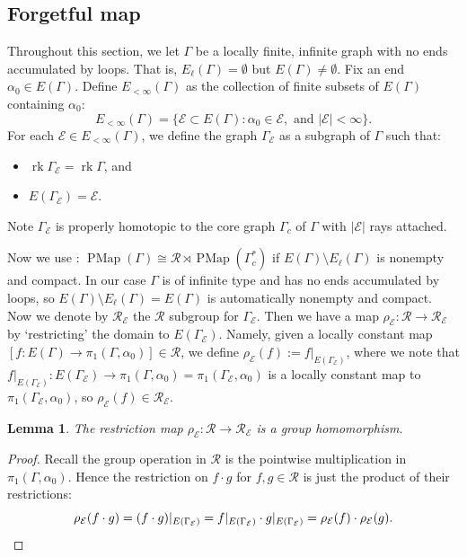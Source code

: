 \documentclass[11pt]{amsart}
\theoremstyle{plain}
\newtheorem{LEM}[THM]{Lemma}
\theoremstyle{definition}
\DeclareMathOperator{\PMap}{PMap}
\DeclareMathOperator{\rk}{rk}
\newcommand{\cE}{\mathcal{E}}
\newcommand{\cR}{\mathcal{R}}
\def\G{{\Gamma}}
\newcommand{\<}{\langle}
\renewcommand{\>}{\rangle}
\begin{document}
\subsection{Forgetful map}
\label{ssec:forgetful}
Throughout this section, we let $\G$ be a locally finite, infinite graph with no ends accumulated by loops. That is, $E_\ell(\G)=\emptyset$ but $E(\G) 
\neq \emptyset$. Fix an end $\alpha_0 \in E(\G)$.
Define $E_{<\infty}(\G)$ as the collection of finite subsets of $E(\G)$ containing $\alpha_0$:
\[
    E_{<\infty}(\G) = \{ \cE \subset E(\G): \alpha_0 \in \cE, \text{ and } |\cE|<\infty\}.
\]
For each $\cE \in E_{<\infty}(\G)$, we define the graph $\G_{\cE}$ as a subgraph of $\G$ such that:
\begin{itemize}
    \item $\rk \G_{\cE} = \rk \G$, and
    \item $E(\G_{\cE}) = \cE$.
\end{itemize}
Note $\G_\cE$ is properly homotopic to the core graph $\G_c$ of $\G$ with $|\cE|$ rays attached.

Now we use : $\PMap(\G) \cong \cR \rtimes \PMap(\G_c^*)$ if $E(\G) \setminus E_\ell(\G)$ is nonempty and compact.
In our case $\G$ is of infinite type and has no ends accumulated by loops, so $E(\G) \setminus E_\ell(\G) = E(\G)$ is automatically nonempty and compact. Now we denote by $\cR_\cE$ the $\cR$ subgroup for $\G_{\cE}$. Then we have a map $\rho_\cE: \cR \to \cR_\cE$ by `restricting' the domain to $E(\G_\cE)$. Namely, given a locally constant map $[f: E(\G) \to \pi_1(\G, \alpha_0)] \in \cR$, we define $\rho_\cE(f):= f|_{E(\G_\cE)}$, where we note that $f|_{E(\G_\cE)}:E(\G_\cE) \to \pi_1(\G,\alpha_0) = \pi_1(\G_\cE,\alpha_0)$ is a locally constant map to $\pi_1(\G_\cE,\alpha_0)$, so $\rho_\cE(f) \in \cR_\cE$.

\begin{LEM}
    The restriction map $\rho_\cE:\cR \to \cR_\cE$ is a group homomorphism.
\end{LEM}

\begin{proof}
    Recall the group operation in $\cR$ is the pointwise multiplication in $\pi_1(\G,\alpha_0)$.
    Hence the restriction on $f \cdot g$ for $f, g \in \cR$ is just the product of their restrictions:
    \[
        \rho_\cE(f\cdot g) = (f\cdot g)|_{E(\G_\cE)} = f|_{E(\G_\cE)} \cdot g|_{E(\G_\cE)} = \rho_\cE(f) \cdot \rho_\cE(g). \qedhere
    \]
\end{proof}
\end{document}
